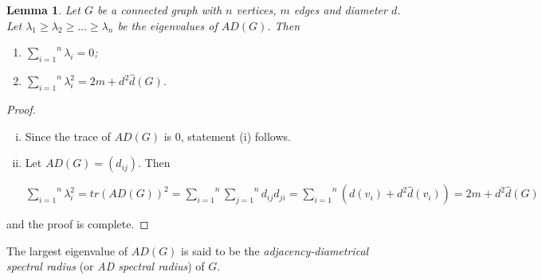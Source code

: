 \documentclass[12pt]{article}
\numberwithin{equation}{section}
\newtheorem{lemma}{Lemma}[section]
\begin{document}
	\begin{lemma}\label{thm 6.1}
		Let $G$ be a connected graph with $n$ vertices, $m$ edges and diameter $d$. Let $\lambda_1 \ge \lambda_2 \ge \dots \ge \lambda_n$ be the eigenvalues of $AD(G)$. Then 
		\begin{enumerate}[\normalfont (i)]
			\item $\overset{n}{\underset{i=1}{\sum}}\lambda_{i}=0$;
			\item $\overset{n}{\underset{i=1}{\sum}} \lambda^2_{i}=2m+d^{2}\hat{d}(G)$.
		\end{enumerate}
	\end{lemma}
	\begin{proof}
		\begin{enumerate}[(i)]
			\item Since the trace of $AD(G)$ is $0$, statement (i) follows.
			\item Let $AD(G)=(d_{ij})$. Then 
			
			$\overset{n}{\underset{i=1}{\sum}} \lambda^2_{i} = tr(AD(G))^2
			=\overset{n}{\underset{i=1}{\sum}}\overset{n}{\underset{j=1}{\sum}}d_{ij}d_{ji}
			=\overset{n}{\underset{i=1}{\sum}}\left(d(v_{i})+d^2\hat{d}(v_i)\right)
			=2m+d^2\hat{d}(G) $
		\end{enumerate}
		and the proof is complete.
	\end{proof}

The largest eigenvalue of $AD(G)$ is said to be the \textit{adjacency-diametrical spectral radius} (or \textit{AD spectral radius}) of $G$.
	
\end{document}
